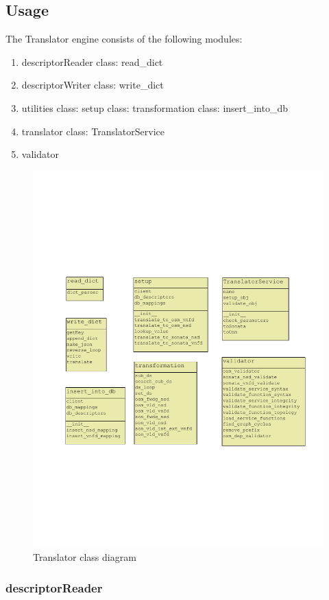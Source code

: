 \subsection{Usage}
The Translator engine consists of the following modules:
\begin{enumerate}
	\item descriptorReader
	\subitem class: read\_dict
	\item descriptorWriter
	\subitem class: write\_dict
	\item utilities
	\subitem class: setup
	\subitem class: transformation
	\subitem class: insert\_into\_db
	\item translator
	\subitem class: TranslatorService
	\item validator
	
\end{enumerate}

\begin{figure}[H]
	\centering
	\includegraphics[width=0.8\linewidth]{"figures/class_diagram_translator"}
	\caption{Translator class diagram}
	\label{fig:class-diagram-translator}
\end{figure}

\subsubsection{descriptorReader}


